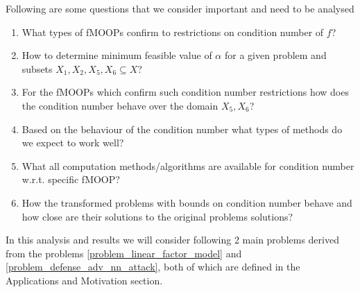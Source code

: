Following are some questions that we consider important and need to be analysed \label{important_questions}
\begin{enumerate}
    \item What types of fMOOPs confirm to restrictions on condition number of $f$? \label{question_restriction}
    \item How to determine minimum feasible value of $\alpha$ for a given problem and subsets $X_1,X_2,X_5,X_6 \subseteq X$? \label{question_alpha_feasible_range}
    \item For the fMOOPs which confirm such condition number restrictions how does the condition number behave over the domain $X_5,X_6$? \label{question_behaviour_of_cond_over_x5x6}
    \item Based on the behaviour of the condition number what types of methods do we expect to work well? \label{question_what_methods_we_expect_to_work}
    \item What all computation methods/algorithms are available for condition number w.r.t. specific fMOOP? \label{question_computation_methods}
    \item How the transformed problems with bounds on condition number behave and how close are their solutions to the original problems solutions? \label{question_transformed_problems_behaviour}
\end{enumerate}
In this analysis and results we will consider following 2 main problems derived from the problems \ref{problem_linear_factor_model} and \ref{problem_defense_adv_nn_attack}, both of which are defined in the Applications and Motivation section.


